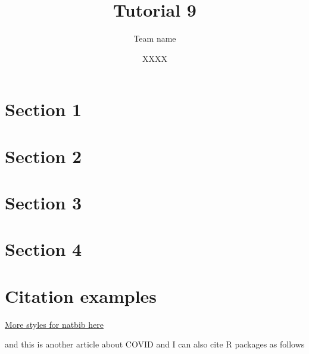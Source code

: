 \documentclass[
]{article}
\title{Tutorial 9}
\subtitle{Team name}
\author{XXXX}
\date{}
\begin{document}
\maketitle

{
\setcounter{tocdepth}{2}
\tableofcontents
}
\clearpage

\hypertarget{section-1}{%
\section{Section 1}\label{section-1}}

\clearpage

\hypertarget{section-2}{%
\section{Section 2}\label{section-2}}

\clearpage

\hypertarget{section-3}{%
\section{Section 3}\label{section-3}}

\clearpage

\hypertarget{section-4}{%
\section{Section 4}\label{section-4}}

\clearpage

\hypertarget{citation-examples}{%
\section{Citation examples}\label{citation-examples}}

\href{https://www.overleaf.com/learn/latex/Natbib_bibliography_styles}{More
styles for natbib here}

\citet{BC64} and this is another article about COVID
\citet{bai2020presumed} and I can also cite R packages as follows
\citet{ggplot2}

  
\end{document}

